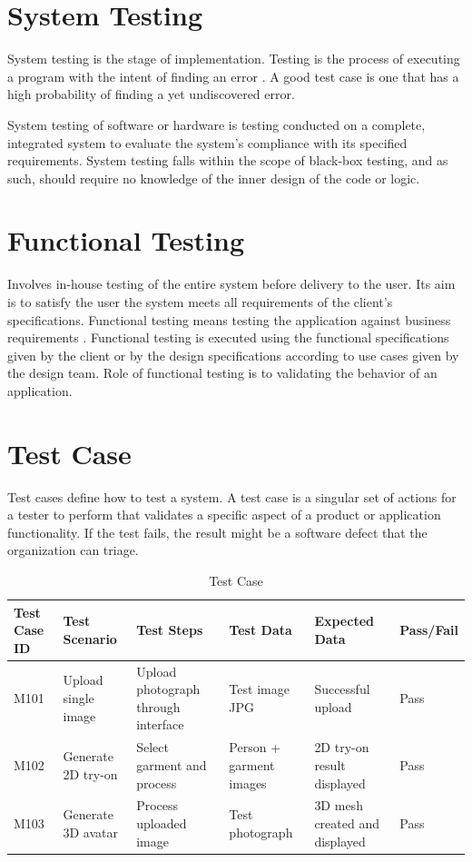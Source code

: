 \documentclass[12pt,a4paper,oneside]{report}
\begin{document}
\section{System Testing}

System testing is the stage of implementation. Testing is the process of executing a program with the intent of finding an error \cite{19}. A good test case is one that has a high probability of finding a yet undiscovered error.

System testing of software or hardware is testing conducted on a complete, integrated system to evaluate the system's compliance with its specified requirements. System testing falls within the scope of black-box testing, and as such, should require no knowledge of the inner design of the code or logic.

\section{Functional Testing}

Involves in-house testing of the entire system before delivery to the user. Its aim is to satisfy the user the system meets all requirements of the client's specifications. Functional testing means testing the application against business requirements \cite{19}. Functional testing is executed using the functional specifications given by the client or by the design specifications according to use cases given by the design team. Role of functional testing is to validating the behavior of an application.

\section{Test Case}

Test cases define how to test a system. A test case is a singular set of actions for a tester to perform that validates a specific aspect of a product or application functionality. If the test fails, the result might be a software defect that the organization can triage.

\begin{table}[H]
\centering
\caption{Test Case}
\label{tab:test-case}
\begin{tabular}{|p{1.5cm}|p{2.5cm}|p{1.5cm}|p{1.5cm}|p{1.5cm}|p{1.5cm}|}
\hline
\textbf{Test Case ID} & \textbf{Test Scenario} & \textbf{Test Steps} & \textbf{Test Data} & \textbf{Expected Data} & \textbf{Pass/Fail} \\
\hline
M101 & Upload single image & Upload photograph through interface & Test image JPG & Successful upload & Pass \\
\hline
M102 & Generate 2D try-on & Select garment and process \cite{16} & Person + garment images & 2D try-on result displayed & Pass \\
\hline
M103 & Generate 3D avatar & Process uploaded image \cite{1} & Test photograph & 3D mesh created and displayed & Pass \\
\hline
\end{tabular}
\end{table}
\end{document}
